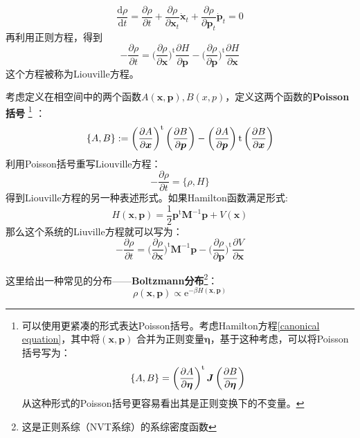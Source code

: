    \begin{equation}
        \frac{\mathrm{d}\rho}{\mathrm{d}t} = \frac {\partial \rho}{\partial t} + \frac {\partial \rho}{\partial \bm{x}_t}\dot{\bm{x}}_t  + \frac {\partial \rho}{\partial \bm{p}_t} \dot{\bm{p}}_t = 0
    \end{equation}
    再利用正则方程，得到
    \begin{equation}
        - \frac {\partial \rho}{\partial t} = \bigg(\frac {\partial \rho}{\partial \bm{x}}\bigg)^\mathrm{t} \frac {\partial H}{\partial \bm{p}} - 
        \bigg(\frac {\partial \rho}{\partial \bm{p}}\bigg)^\mathrm{t} \frac {\partial H}{\partial \bm{x}}
        \label{Liouville equation Euler}
    \end{equation}
    这个方程被称为Liouville方程。
    \par 
    考虑定义在相空间中的两个函数$A(\bm{x}, \bm{p}),B(x ,p)$，定义这两个函数的\textbf{Poisson括号}
    \footnote{
        可以使用更紧凑的形式表达Poisson括号。考虑Hamilton方程\ref{canonical equation}，其中将$(\bm{x}, \bm{p})$
        合并为正则变量$\bm{\eta}$，基于这种考虑，可以将Poisson括号写为：
        \begin{equation}
            \{A, B\} = \left(\frac{\partial{A}}{\partial{\bm{\eta}}}\right)^{\mathrm{t}}\bm{J}\left(\frac{\partial{B}}{\partial{\bm{\eta}}}\right)
        \end{equation}
        从这种形式的Poisson括号更容易看出其是正则变换下的不变量。
    }
    ：
    \begin{equation}
        \{A, B\} := \left(\frac{\partial{A}}{\partial{\bm{x}}}\right)^{\mathrm{t}}\left(\frac{\partial{B}}{\partial{\bm{p}}}\right) - \left(\frac{\partial{A}}{\partial{\bm{p}}}\right)\mathrm{t}\left(\frac{\partial{B}}{\partial{\bm{x}}}\right)
    \end{equation}
    利用Poisson括号重写Liouville方程：
    \begin{equation}
        - \frac {\partial \rho}{\partial t} = \{ \rho, H\}
    \end{equation}
    得到Liouville方程的另一种表述形式。如果Hamilton函数满足形式:
    \begin{equation}
        H(\bm{x},\bm{p}) = \frac{1}{2}\bm{p}^\mathrm{t} \bm{M}^{-1} \bm{p} + V(\bm{x})
    \end{equation}
    那么这个系统的Liuville方程就可以写为：
    \begin{equation} 
        - \frac {\partial \rho}{\partial t} = \bigg(\frac {\partial \rho}{\partial \bm{x}}\bigg)^\mathrm{t} \bm{M}^{-1} \bm{p}
         - \bigg(\frac {\partial \rho}{\partial \bm{p}}\bigg)^\mathrm{t} \frac {\partial V}{\partial \bm{x}}
    \end{equation}
    \par
    这里给出一种常见的分布——\textbf{Boltzmann分布}\footnote{这是正则系综（NVT系综）的系综密度函数}：
    \begin{equation}
        \rho(\bm{x},\bm{p}) \propto \mathrm{e}^{-\beta H(\bm{x},\bm{p})}
    \end{equation}

